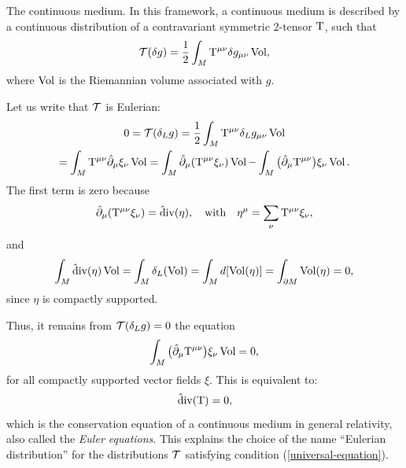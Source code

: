 \begin{Article}{The continuous medium.}{}
  In this framework,
  a continuous medium is described by a continuous distribution of a contravariant symmetric $2$-tensor $\mathrm{T}$,
  such that
  $$
    \mathcal{T}(\delta g) = {1 \over 2} \int_M \mathrm{T}^{\mu\nu} \delta g_{\mu\nu} \operatorname{Vol},
  $$
  where $\operatorname{Vol}$ is the Riemannian volume associated with $g$.
  
  Let us write that $\mathcal{T}$ is Eulerian:
  \begin{multline*}
    0  =\mathcal{T}(\delta_L g)
       = {1 \over 2} \int_M \mathrm{T}^{\mu\nu} \delta_L g_{\mu\nu} \operatorname{Vol} \\
       = \int_M \mathrm{T}^{\mu\nu} \hat\partial_\mu \xi_\nu \operatorname{Vol}
     = \int_M \hat\partial_\mu (\mathrm{T}^{\mu\nu} \xi_\nu) \operatorname{Vol} - \int_M \big(\hat\partial_\mu \mathrm{T}^{\mu\nu}\big) \xi_\nu \operatorname{Vol}.
  \end{multline*}
  The first term is zero because
  $$
    \hat\partial_\mu (\mathrm{T}^{\mu\nu} \xi_\nu) = {\hat{\mathrm d}}\text{iv}(\eta),
    \quad \text{with} \quad
    \eta^\mu = \sum_\nu \mathrm{T}^{\mu\nu} \xi_\nu,
  $$
  and
  $$
    \int_M {\hat{\mathrm d}}\text{iv}(\eta) \operatorname{Vol} = \int_M \delta_L(\operatorname{Vol}) = \int_M d[\operatorname{Vol}(\eta)] = \int_{\partial M} \operatorname{Vol}(\eta) = 0,
  $$
  since $\eta$ is compactly supported.
  
  Thus,
  it remains from $\mathcal{T}(\delta_L g) = 0$ the equation
  $$
    \int_M \big(\hat\partial_\mu \mathrm{T}^{\mu\nu}\big) \xi_\nu \operatorname{Vol} = 0,
  $$
  for all compactly supported vector fields $\xi$.
  This is equivalent to:
  $$
    {\hat{\mathrm d}}\text{iv}(\mathrm{T}) = 0,
  $$
  which is the conservation equation of a continuous medium in general relativity,
  also called the \emph{Euler equations}.
  This explains the choice of the name ``Eulerian distribution'' for the distributions $\mathcal{T}$ satisfying condition (\ref{universal-equation}).
\end{Article}

